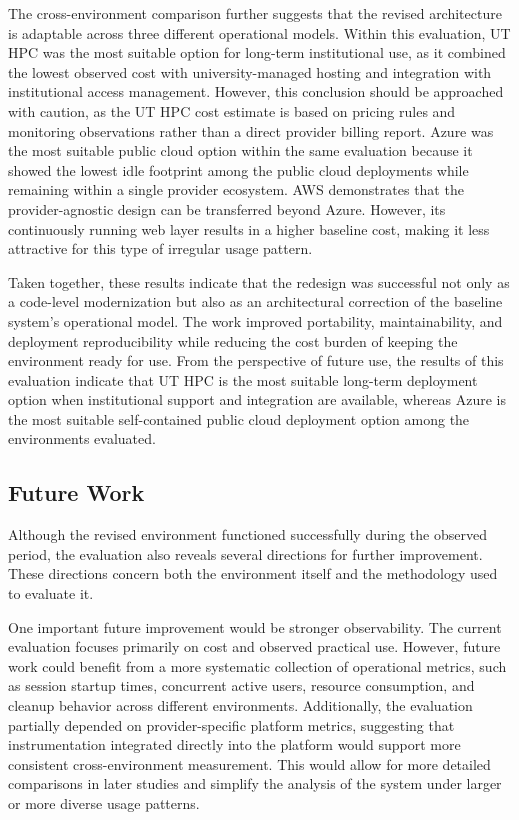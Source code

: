 The cross-environment comparison further suggests that the revised architecture is adaptable across three different operational models.
Within this evaluation, UT HPC was the most suitable option for long-term institutional use, as it combined the lowest observed cost with university-managed hosting and integration with institutional access management.
However, this conclusion should be approached with caution, as the UT HPC cost estimate is based on pricing rules and monitoring observations rather than a direct provider billing report.
Azure was the most suitable public cloud option within the same evaluation because it showed the lowest idle footprint among the public cloud deployments while remaining within a single provider ecosystem.
AWS demonstrates that the provider-agnostic design can be transferred beyond Azure.
However, its continuously running web layer results in a higher baseline cost, making it less attractive for this type of irregular usage pattern.

Taken together, these results indicate that the redesign was successful not only as a code-level modernization but also as an architectural correction of the baseline system's operational model.
The work improved portability, maintainability, and deployment reproducibility while reducing the cost burden of keeping the environment ready for use.
From the perspective of future use, the results of this evaluation indicate that UT HPC is the most suitable long-term deployment option when institutional support and integration are available, whereas Azure is the most suitable self-contained public cloud deployment option among the environments evaluated.

\subsection{Future Work} \label{subsec:future-work}
Although the revised environment functioned successfully during the observed period, the evaluation also reveals several directions for further improvement.
These directions concern both the environment itself and the methodology used to evaluate it.

One important future improvement would be stronger observability.
The current evaluation focuses primarily on cost and observed practical use.
However, future work could benefit from a more systematic collection of operational metrics, such as session startup times, concurrent active users, resource consumption, and cleanup behavior across different environments.
Additionally, the evaluation partially depended on provider-specific platform metrics, suggesting that instrumentation integrated directly into the platform would support more consistent cross-environment measurement.
This would allow for more detailed comparisons in later studies and simplify the analysis of the system under larger or more diverse usage patterns.


